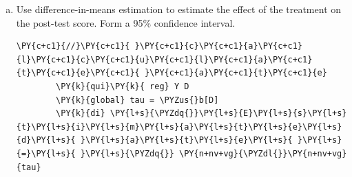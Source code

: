 \documentclass[11pt,notitlepage]{article}\usepackage[]{graphicx}\usepackage[]{color}
\makeatletter
\newenvironment{kframe}{%
 \def\at@end@of@kframe{}%
 \ifinner\ifhmode%
  \def\at@end@of@kframe{\end{minipage}}%
  \begin{minipage}{\columnwidth}%
 \fi\fi%
 \def\FrameCommand##1{\hskip\@totalleftmargin \hskip-\fboxsep
 \colorbox{shadecolor}{##1}\hskip-\fboxsep
     \hskip-\linewidth \hskip-\@totalleftmargin \hskip\columnwidth}%
 \MakeFramed {\advance\hsize-\width
   \@totalleftmargin\z@ \linewidth\hsize
   \@setminipage}}%
 {\par\unskip\endMakeFramed%
 \at@end@of@kframe}
\newenvironment{knitrout}{}{} %
\makeatother
\begin{document}
\begin{enumerate}[a)]
\begin{knitrout}
\begin{kframe}
    \begin{Verbatim}[commandchars=\\\{\}]
Two-sample randomization test for theta=r(Fs) of Fstat by D

Combinations:   48620 = (18 choose 9)
Assuming null=0
Observed theta: 1.274

Minimum time needed for exact test (h:m:s):  0:03:38
Mode: exact

progress: |{\ldots}|

 p=0.31345 [one-tailed test of Ho:  theta(D==0)<=theta(D==1)]
 p=0.76851 [one-tailed test of Ho:  theta(D==0)>=theta(D==1)]
 p=0.31345 [two-tailed test of Ho:  theta(D==0)==theta(D==1)]

Saving log file to 4\_2\_Fstat.dta{\ldots}done.

Fstat = 1.2743363

p.value= .31345125

    \end{Verbatim}

\end{kframe}
\end{knitrout}

We calculated the F-statistic of a regression of treatment assignment on the pretest score for all possible randomizations, and found that the observed F-statistic was larger than 31.35\% of the simulated statistics, implying a $p$-value of 0.313. As expected,we fail to reject the null hypothesis that the treatment assignment is unrelated to the pretreatment covariate, pretest.

\item Use difference-in-means estimation to estimate the effect of the treatment on the post-test score.  Form a 95\% confidence interval.\\

\begin{knitrout}
\color{fgcolor}\begin{kframe}
    \begin{Verbatim}[commandchars=\\\{\}]
	\PY{c+c1}{//}\PY{c+c1}{ }\PY{c+c1}{c}\PY{c+c1}{a}\PY{c+c1}{l}\PY{c+c1}{c}\PY{c+c1}{u}\PY{c+c1}{l}\PY{c+c1}{a}\PY{c+c1}{t}\PY{c+c1}{e}\PY{c+c1}{ }\PY{c+c1}{a}\PY{c+c1}{t}\PY{c+c1}{e}
        \PY{k}{qui}\PY{k}{ reg} Y D
        \PY{k}{global} tau = \PYZus{}b[D]
        \PY{k}{di} \PY{l+s}{\PYZdq{}}\PY{l+s}{E}\PY{l+s}{s}\PY{l+s}{t}\PY{l+s}{i}\PY{l+s}{m}\PY{l+s}{a}\PY{l+s}{t}\PY{l+s}{e}\PY{l+s}{d}\PY{l+s}{ }\PY{l+s}{a}\PY{l+s}{t}\PY{l+s}{e}\PY{l+s}{ }\PY{l+s}{=}\PY{l+s}{ }\PY{l+s}{\PYZdq{}} \PY{n+nv+vg}{\PYZdl{}}\PY{n+nv+vg}{tau}
        

\end{Verbatim}
\end{kframe}
\end{knitrout}
\end{enumerate}
\end{document}
